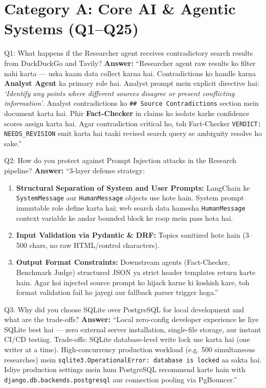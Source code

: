 \documentclass[11pt,a4paper,twoside]{report}
\begin{document}
\section{Category A: Core AI \& Agentic Systems (Q1--Q25)}

\begin{interviewbox}{Q1: What happens if the Researcher agent receives contradictory search results from DuckDuckGo and Tavily?}
\textbf{Answer:} ``Researcher agent raw results ko filter nahi karta --- uska kaam data collect karna hai. Contradictions ko handle karna \textbf{Analyst Agent} ka primary role hai. Analyst prompt mein explicit directive hai: \textit{`Identify any points where different sources disagree or present conflicting information'}. Analyst contradictions ko \texttt{\#\# Source Contradictions} section mein document karta hai. Phir \textbf{Fact-Checker} in claims ko isolate karke confidence scores assign karta hai. Agar contradiction critical ho, toh Fact-Checker \texttt{VERDICT: NEEDS\_REVISION} emit karta hai taaki revised search query se ambiguity resolve ho sake.''
\end{interviewbox}

\begin{interviewbox}{Q2: How do you protect against Prompt Injection attacks in the Research pipeline?}
\textbf{Answer:} ``3-layer defense strategy:
\begin{enumerate}
    \item \textbf{Structural Separation of System and User Prompts:} LangChain ke \texttt{SystemMessage} aur \texttt{HumanMessage} objects use hote hain. System prompt immutable role define karta hai; web search data hamesha \texttt{HumanMessage} context variable ke andar bounded block ke roop mein pass hota hai.
    \item \textbf{Input Validation via Pydantic \& DRF:} Topics sanitized hote hain (3--500 chars, no raw HTML/control characters).
    \item \textbf{Output Format Constraints:} Downstream agents (Fact-Checker, Benchmark Judge) structured JSON ya strict header templates return karte hain. Agar koi injected source prompt ko hijack karne ki koshish kare, toh format validation fail ho jayegi aur fallback parser trigger hoga.''
\end{enumerate}
\end{interviewbox}

\begin{interviewbox}{Q3: Why did you choose SQLite over PostgreSQL for local development and what are the trade-offs?}
\textbf{Answer:} ``Local zero-config developer experience ke liye SQLite best hai --- zero external server installation, single-file storage, aur instant CI/CD testing.
Trade-offs: SQLite database-level write lock use karta hai (one writer at a time). High-concurrency production workload (e.g. 500 simultaneous researches) mein \texttt{sqlite3.OperationalError: database is locked} aa sakta hai. Isliye production settings mein hum PostgreSQL recommend karte hain with \texttt{django.db.backends.postgresql} aur connection pooling via PgBouncer.''
\end{interviewbox}
\end{document}
